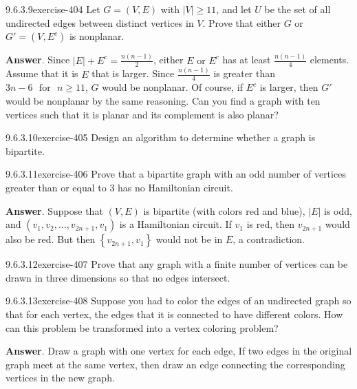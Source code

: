 \documentclass[twoside,10pt,]{book}
\numberwithin{equation}{section}
\begin{document}
\begin{divisionsolution}{9.6.3.9}{}{exercise-404}%
\hypertarget{p-3497}{}%
Let \(G = (V,E)\) with \(|V|\geq 11\), and let \(U\) be the set of all undirected edges between distinct vertices in \(V\).  Prove that either \(G\) or \(G' = \left(V,E^c\right)\) is nonplanar.%
\par\smallskip%
\noindent\textbf{Answer}.\quad%
\hypertarget{p-3498}{}%
Since \(\left| E\right| +E^c=\frac{n(n-1)}{2}\), either \(E \text{ or } E^c\) has at least \(\frac{n(n-1)}{4}\) elements. Assume that it is \(E\) that is larger. Since \(\frac{n(n-1)}{4}\) is greater than \(3n-6\text{  }\text{for}\text{  }n\geqslant 11\), \(G\) would be nonplanar. Of course, if \(E^c\) is larger, then \(G'\) would be nonplanar by the same reasoning.  Can you find a graph with ten vertices such that it is planar and its complement is also planar?%
\end{divisionsolution}%
\begin{divisionsolution}{9.6.3.10}{}{exercise-405}%
\hypertarget{p-3499}{}%
Design an algorithm to determine whether a graph is bipartite.%
\end{divisionsolution}%
\begin{divisionsolution}{9.6.3.11}{}{exercise-406}%
\hypertarget{p-3500}{}%
Prove that a bipartite graph with an odd number of vertices greater than or equal to 3 has no Hamiltonian circuit.%
\par\smallskip%
\noindent\textbf{Answer}.\quad%
\hypertarget{p-3501}{}%
Suppose that \((V,E)\) is bipartite (with colors red and blue), \(\left| E\right|\) is odd, and \(\left(v_1,v_2,\ldots ,v_{2n+1},v_1\right)\) is a Hamiltonian circuit. If \(v_1\) is red, then \(v_{2n+1}\) would also be red. But then \(\left\{v_{2n+1},v_1\right\}\) would not be in \(E\), a contradiction.%
\end{divisionsolution}%
\begin{divisionsolution}{9.6.3.12}{}{exercise-407}%
\hypertarget{p-3502}{}%
Prove that any graph with a finite number of vertices can be drawn in three dimensions so that no edges intersect.%
\end{divisionsolution}%
\begin{divisionsolution}{9.6.3.13}{}{exercise-408}%
\hypertarget{p-3503}{}%
Suppose you had to color the edges of an undirected graph so that for each vertex, the edges that it is connected to have different colors. How can this problem be transformed into a vertex coloring problem?%
\par\smallskip%
\noindent\textbf{Answer}.\quad%
\hypertarget{p-3504}{}%
Draw a graph with one vertex for each edge, If two edges in the original graph meet at the same vertex, then draw an edge connecting the corresponding  vertices in the new graph.%
\end{divisionsolution}%
\end{document}
